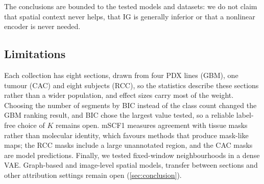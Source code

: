 The conclusions are bounded to the tested models and datasets: we do not claim
that spatial context never helps, that IG is generally inferior or that a
nonlinear encoder is never needed.

\subsection{Limitations}
Each collection has eight sections, drawn from four PDX lines (GBM), one tumour
(CAC) and eight subjects (RCC), so the statistics describe these sections
rather than a wider population, and effect sizes carry most of the weight. Choosing
the number of segments by BIC instead of the class count changed the GBM ranking result,
and BIC chose the largest value tested, so a reliable label-free choice of $K$
remains open.
mSCF1 measures agreement with tissue masks rather than molecular identity,
which favours methods that produce mask-like maps; the RCC masks include a large
unannotated region, and the CAC masks are model predictions. Finally, we tested
fixed-window neighbourhoods in a dense VAE. Graph-based and image-level spatial
models, transfer between sections and other attribution settings remain open
(\cref{sec:conclusion}).
